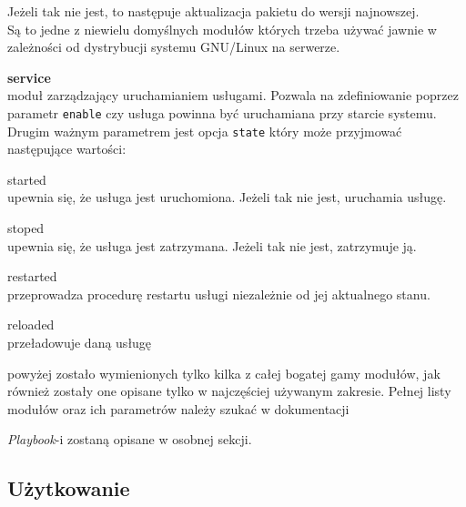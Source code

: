 \begin{description}
\begin{description}
				Jeżeli tak nie jest, to następuje aktualizacja pakietu do wersji najnowszej.\\
				Są to jedne z niewielu domyślnych modułów których trzeba używać jawnie w zależności od dystrybucji systemu GNU/Linux na serwerze.
		\end{description}
	\item{\textbf{service}}\\
		moduł zarządzający uruchamianiem usługami. Pozwala na zdefiniowanie poprzez parametr \texttt{enable} czy usługa powinna być uruchamiana przy starcie systemu.
		Drugim ważnym parametrem jest opcja \texttt{state} który może przyjmować następujące wartości:
		\begin{description}
			\item{started}\\
				upewnia się, że usługa jest uruchomiona. Jeżeli tak nie jest, uruchamia usługę.
			\item{stoped}\\
				upewnia się, że usługa jest zatrzymana. Jeżeli tak nie jest, zatrzymuje ją.
			\item{restarted}\\
				przeprowadza procedurę restartu usługi niezależnie od jej aktualnego stanu.
			\item{reloaded}\\
				przeładowuje daną usługę
		\end{description}
\end{description}
powyżej zostało wymienionych tylko kilka z całej bogatej gamy modułów, jak również zostały one opisane tylko w najczęściej używanym zakresie.
Pełnej listy modułów oraz ich parametrów należy szukać w dokumentacji

\textit{Playbook}-i zostaną opisane w osobnej sekcji.
\subsection{Użytkowanie}
